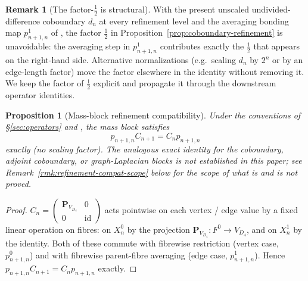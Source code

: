 \documentclass[11pt, a4paper]{amsart}
\newtheorem{proposition}[theorem]{Proposition}
\theoremstyle{definition}
\newtheorem{remark}[theorem]{Remark}
\newcommand{\id}{\operatorname{id}}
\begin{document}
\begin{remark}[The factor-$\tfrac{1}{2}$ is structural]
\label{rmk:factor-structural}
With the present unscaled undivided-difference coboundary $d_n$
at every refinement level and the averaging bonding map
$p_{n+1, n}^1$ of \cite[Definition~\texttt{def:p1} (using the edge-parent map of Definition~\texttt{def:edge-parent})]{RefinementSpaces}, the factor
$\tfrac{1}{2}$ in Proposition~\ref{prop:coboundary-refinement} is
unavoidable: the averaging step in $p_{n+1, n}^1$ contributes
exactly the $\tfrac{1}{2}$ that appears on the right-hand side.
Alternative normalizations (e.g.\ scaling $d_n$ by $2^n$ or by an
edge-length factor) move the factor elsewhere in the identity
without removing it. We keep the factor of $\tfrac{1}{2}$
explicit and propagate it through the downstream operator
identities.
\end{remark}

\begin{proposition}[Mass-block refinement compatibility]
\label{prop:mass-refinement}
Under the conventions of \S\ref{sec:operators} and
\cite{RefinementSpaces}, the mass block satisfies
\[
  p_{n+1, n} C_{n+1} = C_n p_{n+1, n}
\]
exactly (no scaling factor). The analogous exact identity for the
coboundary, adjoint coboundary, or graph-Laplacian blocks is not
established in this paper; see
Remark~\ref{rmk:refinement-compat-scope} below for the scope of
what is and is not proved.
\end{proposition}

\begin{proof}
$C_n = \begin{pmatrix} \mathbf{P}_{V_{D_4}} & 0 \\ 0 & \id
\end{pmatrix}$ acts pointwise on each vertex / edge value by a
fixed linear operation on fibres: on $X_n^0$ by the projection
$\mathbf{P}_{V_{D_4}} \colon F^0 \to V_{D_4}$, and on $X_n^1$ by
the identity. Both of these commute with fibrewise restriction
(vertex case, $p_{n+1, n}^0$) and with fibrewise parent-fibre
averaging (edge case, $p_{n+1, n}^1$). Hence $p_{n+1, n} C_{n+1} =
C_n p_{n+1, n}$ exactly.
\end{proof}
\end{document}

